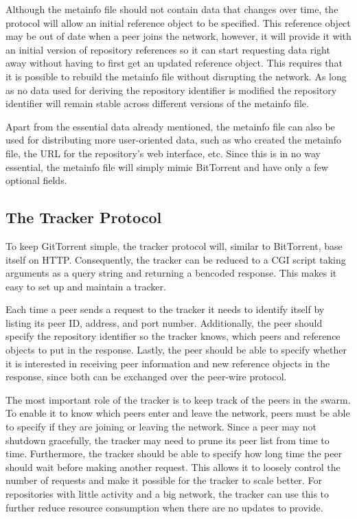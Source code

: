 Although the metainfo file should not contain data that changes over
time, the protocol will allow an initial reference object to be
specified. This reference object may be out of date when a peer joins
the network, however, it will provide it with an initial version of
repository references so it can start requesting data right away
without having to first get an updated reference object. This requires
that it is possible to rebuild the metainfo file without disrupting
the network. As long as no data used for deriving the repository
identifier is modified the repository identifier will remain stable
across different versions of the metainfo file.

Apart from the essential data already mentioned, the metainfo file can
also be used for distributing more user-oriented data, such as who
created the metainfo file, the URL for the repository's web interface,
etc. Since this is in no way essential, the metainfo file will simply
mimic BitTorrent and have only a few optional fields.


\subsection{The Tracker Protocol}
\label{sec:tracker}

To keep GitTorrent simple, the tracker protocol will, similar to
BitTorrent, base itself on HTTP. Consequently, the tracker can be
reduced to a CGI script taking arguments as a query string and
returning a bencoded response. This makes it easy to set up and
maintain a tracker.

Each time a peer sends a request to the tracker it needs to identify
itself by listing its peer ID, address, and port number.
Additionally, the peer should specify the repository identifier so the
tracker knows, which peers and reference objects to put in the
response. Lastly, the peer should be able to specify whether it is
interested in receiving peer information and new reference objects in
the response, since both can be exchanged over the peer-wire protocol.

The most important role of the tracker is to keep track of the peers
in the swarm. To enable it to know which peers enter and leave the
network, peers must be able to specify if they are joining or
leaving the network. Since a peer may not shutdown gracefully, the
tracker may need to prune its peer list from time to time.
Furthermore, the tracker should be able to specify how long time
the peer should wait before making another request. This allows it to
loosely control the number of requests and make it possible for the
tracker to scale better. For repositories with little activity and a
big network, the tracker can use this to further reduce resource
consumption when there are no updates to provide.

